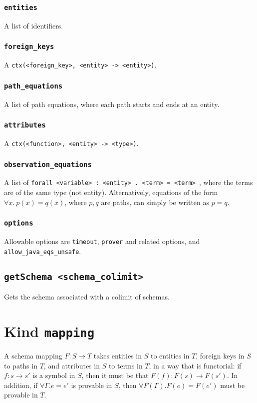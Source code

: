 \documentclass[10pt]{book}
\begin{document}
\subsection{{\tt entities}}
A list of identifiers.
\subsection{{\tt foreign\_keys}}
A {\tt ctx(<foreign\_key>, <entity> -> <entity>)}.
\subsection{{\tt path\_equations}}
A list of path equations, where each path starts and ends at an entity.
\subsection{{\tt attributes}}
A {\tt ctx(<function>, <entity> -> <type>)}.
\subsection{{\tt observation\_equations}}
A list of {\tt forall <variable> : <entity> . <term> = <term> }, where the terms are of the same type (not entity).  Alternatively, equations of the form $\forall x. \ p(x) = q(x)$, where $p,q$ are paths, can simply be written as $p = q$.

\subsection{{\tt options}}
Allowable options are {\tt timeout}, {\tt prover} and related options, and {\tt allow\_java\_eqs\_unsafe}.

\section{{\tt getSchema <schema\_colimit>}}

Gets the schema associated with a colimit of schemas.

\chapter{Kind  {\tt mapping}}

A schema mapping $F : S \to T$ takes entities in $S$ to entities in $T$, foreign keys in $S$ to paths in $T$, and attributes in $S$ to terms in $T$, in a way that is functorial: if $f : s \to s'$ is a symbol in $S$, then it must be that $F(f) : F(s) \to F(s')$.  In addition, if $\forall \Gamma . e = e'$ is provable in $S$, then $\forall F(\Gamma). F(e) = F(e')$ must be provable in $T$.
\end{document}
